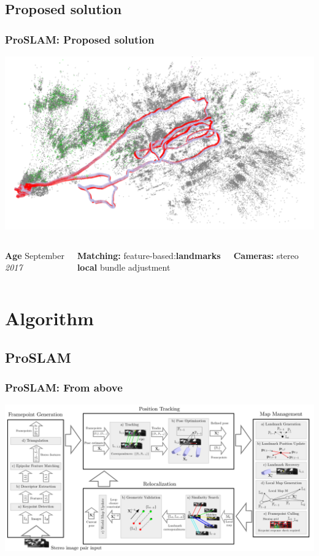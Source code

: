 \documentclass[16pt]{beamer}
\begin{document}
\subsection{Proposed solution}
\begin{frame}
  \frametitle{ProSLAM:    Proposed solution}

  \centering
  \includegraphics[width=1\textwidth]{slam7}
  \begin{columns}
    \begin{block}{\textbf{Age}}
      September\\
      \textsl{2017}
    \end{block}
    \begin{block}{\textbf{Matching:}}
      feature-based:\quad\textbf{landmarks}\\
      \textbf{local} bundle adjustment
    \end{block}
    \begin{block}{\textbf{Cameras:}}
      stereo
    \end{block}
 
  \end{columns}

\end{frame}
 
\section{ Algorithm}
\subsection*{ProSLAM}
\begin{frame}
  \frametitle{ProSLAM: From above }
  \includegraphics[width=1\textwidth]{slam0}
\end{frame}
\end{document}
